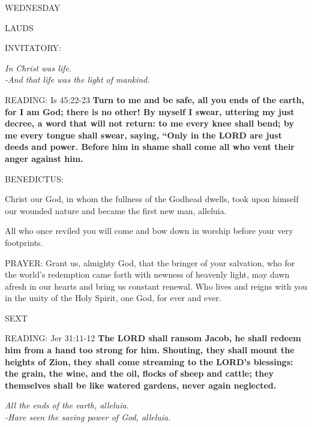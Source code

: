 \begin{center}
\normalsize WEDNESDAY
\end{center}

\begin{flushleft}\normalsize{\uppercase{LAUDS\\}}\end{flushleft}
\small{\uppercase{INVITATORY:}}\normalsize
\begin{center}
\textit{In Christ was life.\\}
\textit{-And that life was the light of mankind.\\}
\end{center}
\noindent\small{\uppercase{READING:}}    Is 45:22-23 \textbf{   Turn to me and be safe, all you ends of the earth, for I am God; there is no other! By myself I swear, uttering my just decree, a word that will not return: to me every knee shall bend; by me every tongue shall swear, saying, “Only in the LORD are just deeds and power. Before him in shame shall come all who vent their anger against him.\\}

\noindent\small{\uppercase{BENEDICTUS:}} \begin{description}[labelindent=\parindent, leftmargin=*]
\item [(before the Epiphany)] Christ our God, in whom the fullness of the Godhead dwells, took upon himself our wounded nature and became the first new man, alleluia.
\item [(Friday after the Epiphany)]All who once reviled you will come and bow down in worship before your very footprints.
\end{description}

\noindent\small{\uppercase{PRAYER:}}	Grant us, almighty God, that the bringer of your salvation, who for the world's redemption came forth with newness of heavenly light, may dawn afresh in our hearts and bring us constant renewal. Who lives and reigns with you in the unity of the Holy Spirit, one God, for ever and ever.

\begin{flushleft}\normalsize{\uppercase{SEXT\\}}\end{flushleft}
\noindent\small{\uppercase{READING:}}    Jer 31:11-12 \textbf{   The LORD shall ransom Jacob, he shall redeem him from a hand too strong for him. Shouting, they shall mount the heights of Zion, they shall come streaming to the LORD’s blessings: the grain, the wine, and the oil, flocks of sheep and cattle; they themselves shall be like watered gardens, never again neglected.}
\begin{center}\textit{All the ends of the earth, alleluia.\\
-Have seen the saving power of God, alleluia.}\end{center}

